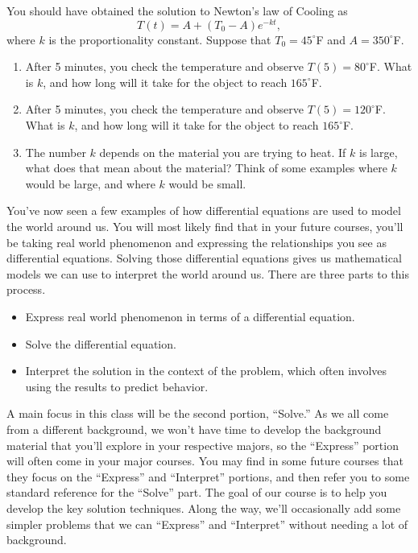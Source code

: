 \begin{problem}
 You should have obtained the solution to Newton's law of Cooling as $$T(t) = A+(T_0-A)e^{-kt},$$ where $k$ is the proportionality constant. Suppose that $T_0=45^\circ$F and $A=350^\circ$F.  
\begin{enumerate}
 \item After 5 minutes, you check the temperature and observe $T(5)=80^\circ$F.  What is $k$, and how long will it take for the object to reach $165^\circ$F. 
 \item After 5 minutes, you check the temperature and observe $T(5)=120^\circ$F.  What is $k$, and how long will it take for the object to reach $165^\circ$F. 
 \item The number $k$ depends on the material you are trying to heat.  If $k$ is large, what does that mean about the material?  Think of some examples where $k$ would be large, and where $k$ would be small.
\end{enumerate}
\end{problem}

You've now seen a few examples of how differential equations are used to model the world around us. You will most likely find that in your future courses, you'll be taking real world phenomenon and expressing the relationships you see as differential equations. Solving those differential equations gives us mathematical models we can use to interpret the world around us. There are three parts to this process. 
\begin{itemize}
 \item Express real world phenomenon in terms of a differential equation.
 \item Solve the differential equation.
 \item Interpret the solution in the context of the problem, which often involves using the results to predict behavior.
\end{itemize}
A main focus in this class will be the second portion, ``Solve.''  As we all come from a different background, we won't have time to develop the background material that you'll explore in your respective majors, so the ``Express'' portion will often come in your major courses. You may find in some future courses that they focus on the ``Express'' and ``Interpret'' portions, and then refer you to some standard reference for the ``Solve'' part. The goal of our course is to help you develop the key solution techniques. Along the way, we'll occasionally add some simpler problems that we can ``Express'' and ``Interpret'' without needing a lot of background.

